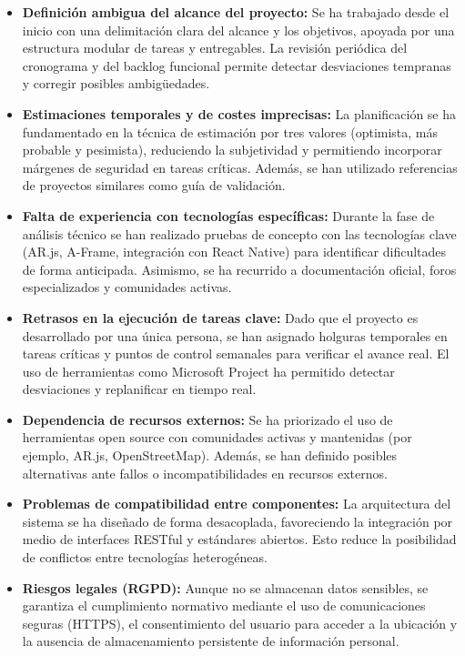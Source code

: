 \begin{itemize}
  \item \textbf{Definición ambigua del alcance del proyecto:} Se ha trabajado desde el inicio con una delimitación clara del alcance y los objetivos, apoyada por una estructura modular de tareas y entregables. La revisión periódica del cronograma y del backlog funcional permite detectar desviaciones tempranas y corregir posibles ambigüedades.

  \item \textbf{Estimaciones temporales y de costes imprecisas:} La planificación se ha fundamentado en la técnica de estimación por tres valores (optimista, más probable y pesimista), reduciendo la subjetividad y permitiendo incorporar márgenes de seguridad en tareas críticas. Además, se han utilizado referencias de proyectos similares como guía de validación.

  \item \textbf{Falta de experiencia con tecnologías específicas:} Durante la fase de análisis técnico se han realizado pruebas de concepto con las tecnologías clave (AR.js, A-Frame, integración con React Native) para identificar dificultades de forma anticipada. Asimismo, se ha recurrido a documentación oficial, foros especializados y comunidades activas.

  \item \textbf{Retrasos en la ejecución de tareas clave:} Dado que el proyecto es desarrollado por una única persona, se han asignado holguras temporales en tareas críticas y puntos de control semanales para verificar el avance real. El uso de herramientas como Microsoft Project ha permitido detectar desviaciones y replanificar en tiempo real.

  \item \textbf{Dependencia de recursos externos:} Se ha priorizado el uso de herramientas open source con comunidades activas y mantenidas (por ejemplo, AR.js, OpenStreetMap). Además, se han definido posibles alternativas ante fallos o incompatibilidades en recursos externos.

  \item \textbf{Problemas de compatibilidad entre componentes:} La arquitectura del sistema se ha diseñado de forma desacoplada, favoreciendo la integración por medio de interfaces RESTful y estándares abiertos. Esto reduce la posibilidad de conflictos entre tecnologías heterogéneas.

  \item \textbf{Riesgos legales (RGPD):} Aunque no se almacenan datos sensibles, se garantiza el cumplimiento normativo mediante el uso de comunicaciones seguras (HTTPS), el consentimiento del usuario para acceder a la ubicación y la ausencia de almacenamiento persistente de información personal.
\end{itemize}


